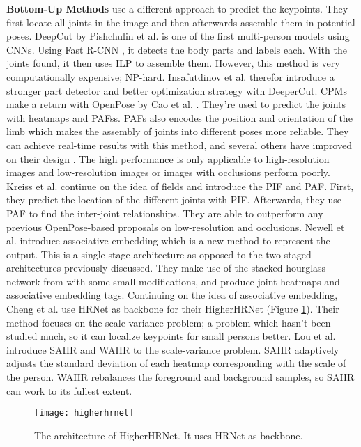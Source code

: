 \textbf{Bottom-Up Methods} use a different approach to predict the keypoints.
They first locate all joints in the image and then afterwards assemble them in potential poses.
DeepCut by Pishchulin et al. \cite{Pishchulin2015} is one of the first multi-person models using \glspl{CNN}.
Using Fast R-CNN \cite{Ren2015}, it detects the body parts and labels each.
With the joints found, it then uses \gls{ILP} to assemble them.
However, this method is very computationally expensive; NP-hard.
Insafutdinov et al. \cite{Insafutdinov2016} therefor introduce a stronger part detector and better optimization strategy with DeeperCut.
\gls{CPMs} make a return with OpenPose by Cao et al. \cite{Cao2018}.
They're used to predict the joints with heatmaps and \glspl{PAFs}.
PAFs also encodes the position and orientation of the limb which makes the assembly of joints into different poses more reliable.
They can achieve real-time results with this method, and several others have improved on their design \cite{Zhu2017a, Hidalgo2019, Li2019b}.
The high performance is only applicable to high-resolution images and low-resolution images or images with occlusions perform poorly.
Kreiss et al. \cite{Kreiss2019} continue on the idea of fields and introduce the \gls{PIF} and \gls{PAF}.
First, they predict the location of the different joints with \gls{PIF}.
Afterwards, they use \gls{PAF} to find the inter-joint relationships.
They are able to outperform any previous OpenPose-based proposals on low-resolution and occlusions.
Newell et al. \cite{Newell2016-2} introduce associative embedding which is a new method to represent the output.
This is a single-stage architecture as opposed to the two-staged architectures previously discussed.
They make use of the stacked hourglass network from \cite{Newell2016} with some small modifications, and produce joint heatmaps and associative embedding tags.
Continuing on the idea of associative embedding, Cheng et al. \cite{Cheng2019} use HRNet \cite{Sun2019} as backbone for their HigherHRNet (Figure \ref{fig:higherhrnet}).
Their method focuses on the scale-variance problem; a problem which hasn't been studied much, so it can localize keypoints for small persons better.
Lou et al. \cite{Lou2020} introduce \gls{SAHR} and \gls{WAHR} to the scale-variance problem.
\gls{SAHR} adaptively adjusts the standard deviation of each heatmap corresponding with the scale of the person.
\gls{WAHR} rebalances the foreground and background samples, so \gls{SAHR} can work to its fullest extent.

\begin{figure}[h]
	\centering
	\texttt{[image: higherhrnet]}%
	\caption{
		The architecture of HigherHRNet. It uses HRNet as backbone. \cite{Cheng2019}
	}
	\label{fig:higherhrnet}
\end{figure}


